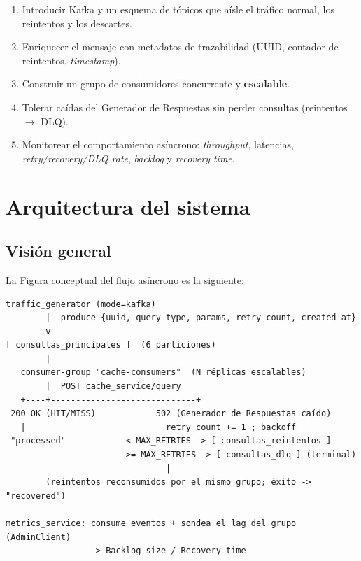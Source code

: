 \documentclass[11pt,a4paper]{article}
\begin{document}
\begin{enumerate}[noitemsep]
  \item Introducir Kafka y un esquema de tópicos que aísle el tráfico normal,
        los reintentos y los descartes.
  \item Enriquecer el mensaje con metadatos de trazabilidad (UUID, contador de
        reintentos, \emph{timestamp}).
  \item Construir un grupo de consumidores concurrente y \textbf{escalable}.
  \item Tolerar caídas del Generador de Respuestas sin perder consultas
        (reintentos $\to$ DLQ).
  \item Monitorear el comportamiento asíncrono: \emph{throughput}, latencias,
        \emph{retry/recovery/DLQ rate}, \emph{backlog} y \emph{recovery time}.
\end{enumerate}

\section{Arquitectura del sistema}

\subsection{Visión general}
La Figura conceptual del flujo asíncrono es la siguiente:

\begin{lstlisting}[caption={Flujo de procesamiento asíncrono}]
traffic_generator (mode=kafka)
        |  produce {uuid, query_type, params, retry_count, created_at}
        v
[ consultas_principales ]  (6 particiones)
        |
   consumer-group "cache-consumers"  (N réplicas escalables)
        |  POST cache_service/query
   +----+-----------------------------+
 200 OK (HIT/MISS)            502 (Generador de Respuestas caído)
   |                            retry_count += 1 ; backoff
 "processed"            < MAX_RETRIES -> [ consultas_reintentos ]
                        >= MAX_RETRIES -> [ consultas_dlq ] (terminal)
                                |
        (reintentos reconsumidos por el mismo grupo; éxito -> "recovered")

metrics_service: consume eventos + sondea el lag del grupo (AdminClient)
                 -> Backlog size / Recovery time
\end{lstlisting}
\end{document}
